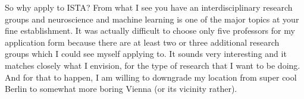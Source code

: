 \documentclass[a4paper,10pt]{article}
\begin{document}
So why apply to ISTA? 
From what I see you have an interdisciplinary
research groups and neuroscience and machine learning is one of the major topics
at your fine establishment. 
It was actually difficult to choose only five professors for my application form
because there are at least two or three additional research groups which I could
see myself applying to.
It sounds very interesting and it matches closely what I envision, for the type
of research that I want
to be doing. And for that to happen, I am willing to downgrade my location from
super cool Berlin to somewhat more boring Vienna (or its vicinity rather).

\nocite{mpgvaeRepo}
\nocite{mg22Repo}
\printbibliography
\end{document}
